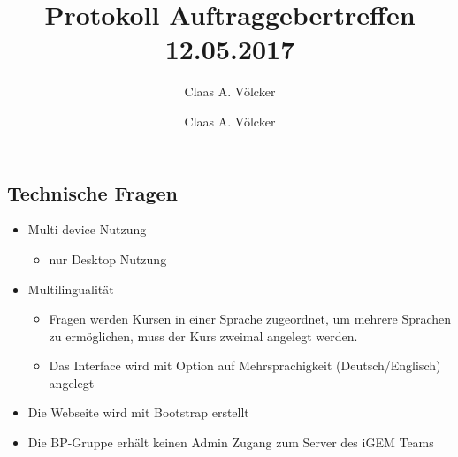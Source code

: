 \documentclass[colorback, accentcolor=tud1c, paper=a4]{tudexercise}
\title{Protokoll Auftraggebertreffen 12.05.2017}
\subtitle{Claas A. Völcker}
\author{Claas A. Völcker}
\begin{document}
	
	\maketitle
\begin{multicols}{2}
\subsection*{Technische Fragen}
	\begin{itemize}
	\item Multi device Nutzung
		\begin{itemize}
		\item nur Desktop Nutzung
		\end{itemize} 	
	\item Multilingualität
		\begin{itemize}
		\item Fragen werden Kursen in einer Sprache zugeordnet, um mehrere Sprachen zu ermöglichen, muss der Kurs zweimal angelegt werden.
		\item Das Interface wird mit Option auf Mehrsprachigkeit (Deutsch/Englisch) angelegt
		\end{itemize}
	\item Die Webseite wird mit Bootstrap erstellt
	\item Die BP-Gruppe erhält keinen Admin Zugang zum Server des iGEM Teams
	\end{itemize}

\end{multicols}
\end{document}
